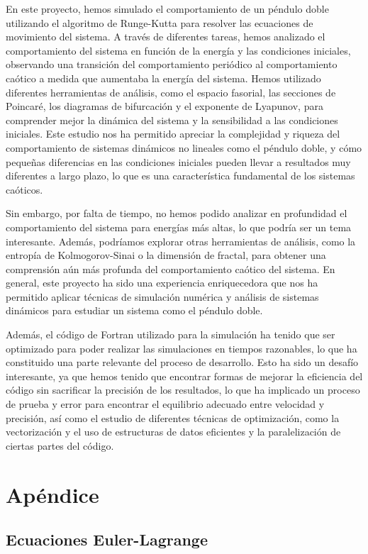 \documentclass[10pt,onecolumn]{article}
\begin{document}
En este proyecto, hemos simulado el comportamiento de un péndulo doble utilizando el algoritmo de Runge-Kutta para resolver las ecuaciones de movimiento del sistema. A través de diferentes tareas, hemos analizado el comportamiento del sistema en función de la energía y las condiciones iniciales, observando una transición del comportamiento periódico al comportamiento caótico a medida que aumentaba la energía del sistema. Hemos utilizado diferentes herramientas de análisis, como el espacio fasorial, las secciones de Poincaré, los diagramas de bifurcación y el exponente de Lyapunov, para comprender mejor la dinámica del sistema y la sensibilidad a las condiciones iniciales. Este estudio nos ha permitido apreciar la complejidad y riqueza del comportamiento de sistemas dinámicos no lineales como el péndulo doble, y cómo pequeñas diferencias en las condiciones iniciales pueden llevar a resultados muy diferentes a largo plazo, lo que es una característica fundamental de los sistemas caóticos.

Sin embargo, por falta de tiempo, no hemos podido analizar en profundidad el comportamiento del sistema para energías más altas, lo que podría ser un tema interesante. Además, podríamos explorar otras herramientas de análisis, como la entropía de Kolmogorov-Sinai o la dimensión de fractal, para obtener una comprensión aún más profunda del comportamiento caótico del sistema. En general, este proyecto ha sido una experiencia enriquecedora que nos ha permitido aplicar técnicas de simulación numérica y análisis de sistemas dinámicos para estudiar un sistema como el péndulo doble.

Además, el código de Fortran utilizado para la simulación ha tenido que ser optimizado para poder realizar las simulaciones en tiempos razonables, lo que ha constituido una parte relevante del proceso de desarrollo. Esto ha sido un desafío interesante, ya que hemos tenido que encontrar formas de mejorar la eficiencia del código sin sacrificar la precisión de los resultados, lo que ha implicado un proceso de prueba y error para encontrar el equilibrio adecuado entre velocidad y precisión, así como el estudio de diferentes técnicas de optimización, como la vectorización y el uso de estructuras de datos eficientes y la paralelización de ciertas partes del código.


\section{Apéndice}

\subsection{Ecuaciones Euler-Lagrange}
\end{document}
